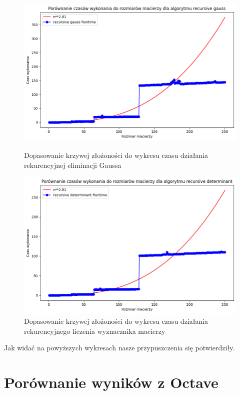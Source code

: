 \documentclass{article}
\begin{document}
\begin{figure}[H]
    \begin{minipage}{0.45\textwidth}
        \includegraphics[width=\linewidth]{images/gauss_curve.png}
        \caption{Dopasowanie krzywej złożoności do wykresu czasu działania rekurencyjnej eliminacji Gaussa}
    \end{minipage}%
    \hfill
    \begin{minipage}{0.45\textwidth}
        \includegraphics[width=\linewidth]{images/determinant_curve.png}
        \caption{Dopasowanie krzywej złożoności do wykresu czasu działania rekurencyjnego liczenia wyznacznika macierzy}
    \end{minipage}
\end{figure}

\noindent
Jak widać na powyższych wykresach nasze przypuszczenia się potwierdziły.

\section{Porównanie wyników z Octave}
\end{document}
